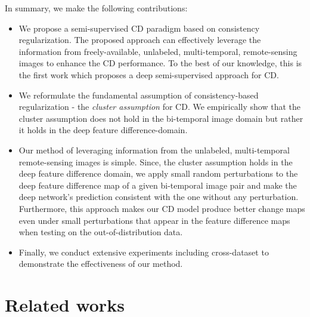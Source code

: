 \documentclass[runningheads]{llncs}
\begin{document}
In summary, we make the following contributions:
\begin{itemize}
    \item We propose a semi-supervised CD paradigm based on consistency regularization. The proposed approach can effectively leverage the information from freely-available, unlabeled, multi-temporal, remote-sensing images to enhance the CD performance. To the best of our knowledge, this is the first work which proposes a deep semi-supervised approach for CD.
    
    \item We reformulate the fundamental assumption of consistency-based regularization - the \textit{cluster assumption} for CD. We empirically show that the cluster assumption does not hold in the bi-temporal image domain but rather it holds in the deep feature difference-domain.

    \item Our method of leveraging information from the unlabeled, multi-temporal remote-sensing images is simple. Since, the cluster assumption holds in the deep feature difference domain, we apply small random perturbations to the deep feature difference map of a given bi-temporal image pair and make the deep network's prediction consistent with the one without any perturbation. Furthermore, this approach makes our CD model produce  better change maps even under small perturbations that appear in the feature difference maps when testing on the out-of-distribution data.
    
    \item Finally, we conduct extensive experiments including cross-dataset to demonstrate the effectiveness of our method.
\end{itemize}

\vspace{-5mm}
\section{Related works}
\label{sec:related_work}
\end{document}
